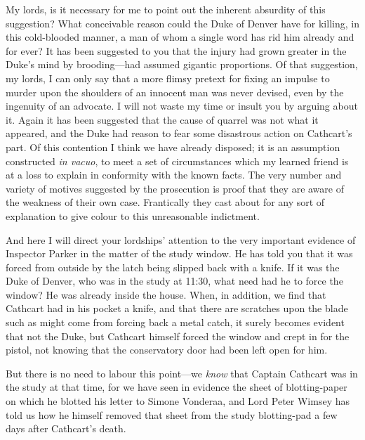 \begin{dialogue}
My lords, is it necessary for me to point out the inherent absurdity of this suggestion? What conceivable reason could the Duke of Denver have for killing, in this cold-blooded manner, a man of whom a single word has rid him already and for ever? It has been suggested to you that the injury had grown greater in the Duke's mind by brooding\allowbreak---\allowbreak had assumed gigantic proportions. Of that suggestion, my lords, I can only say that a more flimsy pretext for fixing an impulse to murder upon the shoulders of an innocent man was never devised, even by the ingenuity of an advocate. I will not waste my time or insult you by arguing about it. Again it has been suggested that the cause of quarrel was not what it appeared, and the Duke had reason to fear some disastrous action on Cathcart's part. Of this contention I think we have already disposed; it is an assumption constructed \textit{in vacuo}, to meet a set of circumstances which my learned friend is at a loss to explain in conformity with the known facts. The very number and variety of motives suggested by the prosecution is proof that they are aware of the weakness of their own case. Frantically they cast about for any sort of explanation to give colour to this unreasonable indictment.

\smallskip 

And here I will direct your lordships' attention to the very important evidence of Inspector Parker in the matter of the study window. He has told you that it was forced from outside by the latch being slipped back with a knife. If it was the Duke of Denver, who was in the study at 11:30, what need had he to force the window? He was already inside the house. When, in addition, we find that Cathcart had in his pocket a knife, and that there are scratches upon the blade such as might come from forcing back a metal catch, it surely becomes evident that not the Duke, but Cathcart himself forced the window and crept in for the pistol, not knowing that the conservatory door had been left open for him.

\smallskip 

But there is no need to labour this point\allowbreak---\allowbreak we \textit{know} that Captain Cathcart was in the study at that time, for we have seen in evidence the sheet of blotting-paper on which he blotted his letter to Simone Vonderaa, and Lord Peter Wimsey has told us how he himself removed that sheet from the study blotting-pad a few days after Cathcart's death.

\smallskip 


\end{dialogue}
